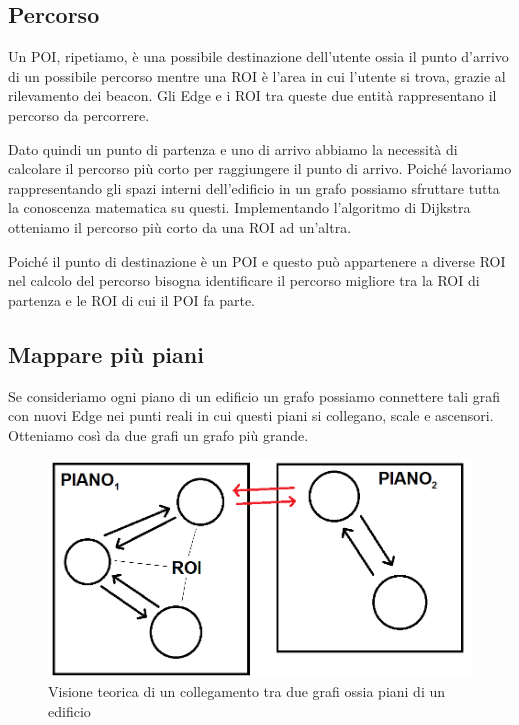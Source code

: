 \documentclass[../ManualeSviluppatore.tex]{subfiles}
\begin{document}
	
	\subsection{Percorso}
	Un POI, ripetiamo, è una possibile destinazione dell'utente ossia il punto d'arrivo di un possibile percorso mentre una ROI è l'area in cui l'utente si trova, grazie al rilevamento dei \gls{beacon}. Gli Edge e i ROI tra queste due entità rappresentano il percorso da percorrere.
	
	Dato quindi un punto di partenza e uno di arrivo abbiamo la necessità di calcolare il percorso più corto per raggiungere il punto di arrivo. Poiché lavoriamo rappresentando gli spazi interni dell'edificio in un grafo possiamo sfruttare tutta la conoscenza matematica su questi.
	Implementando l'algoritmo di Dijkstra otteniamo il percorso più corto da una ROI ad un'altra.
	
	Poiché il punto di destinazione è un POI e questo può appartenere a diverse ROI nel calcolo del percorso bisogna identificare il percorso migliore tra la ROI di partenza e le ROI di cui il POI fa parte.

	
	
	\subsection{Mappare più piani}
	
		Se consideriamo ogni piano di un edificio un grafo possiamo connettere tali grafi con nuovi Edge nei punti reali in cui questi piani si collegano, scale e ascensori. Otteniamo così da due grafi un grafo più grande.
		
		\begin{figure} [h]
			\centering
			\includegraphics[scale=0.4]{img/GRAFI-CONNESSI}
			\caption{Visione teorica di un collegamento tra due grafi ossia piani di un edificio}
			\label{fig:GRAFI-CONNESSI}
	\end{figure}
	
\end{document}

